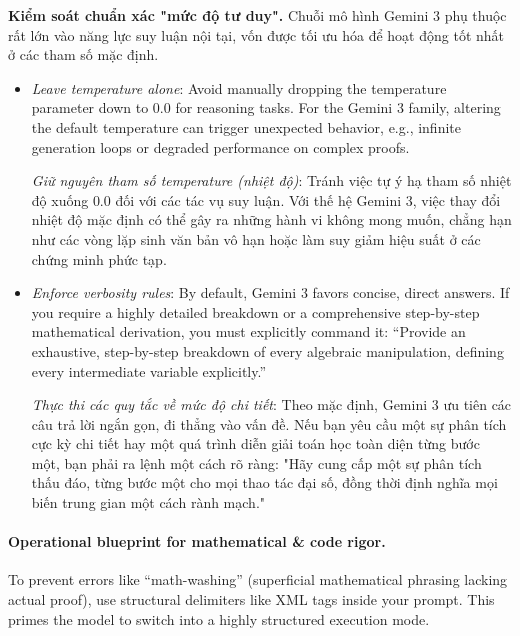 \documentclass{article}
\begin{document}
\begin{enumerate}
	\textbf{Kiểm soát chuẩn xác "mức độ tư duy".} Chuỗi mô hình Gemini 3 phụ thuộc rất lớn vào năng lực suy luận nội tại, vốn được tối ưu hóa để hoạt động tốt nhất ở các tham số mặc định.
	\begin{itemize}
		\item \textit{Leave temperature alone}: Avoid manually dropping the temperature parameter down to $0.0$ for reasoning tasks. For the Gemini 3 family, altering the default temperature can trigger unexpected behavior, e.g., infinite generation loops or degraded performance on complex proofs.
		
		\textit{Giữ nguyên tham số temperature (nhiệt độ)}: Tránh việc tự ý hạ tham số nhiệt độ xuống $0.0$ đối với các tác vụ suy luận. Với thế hệ Gemini 3, việc thay đổi nhiệt độ mặc định có thể gây ra những hành vi không mong muốn, chẳng hạn như các vòng lặp sinh văn bản vô hạn hoặc làm suy giảm hiệu suất ở các chứng minh phức tạp.
		\item \textit{Enforce verbosity rules}: By default, Gemini 3 favors concise, direct answers. If you require a highly detailed breakdown or a comprehensive step-by-step mathematical derivation, you must explicitly command it: ``Provide an exhaustive, step-by-step breakdown of every algebraic manipulation, defining every intermediate variable explicitly.''
		
		\textit{Thực thi các quy tắc về mức độ chi tiết}: Theo mặc định, Gemini 3 ưu tiên các câu trả lời ngắn gọn, đi thẳng vào vấn đề. Nếu bạn yêu cầu một sự phân tích cực kỳ chi tiết hay một quá trình diễn giải toán học toàn diện từng bước một, bạn phải ra lệnh một cách rõ ràng: "Hãy cung cấp một sự phân tích thấu đáo, từng bước một cho mọi thao tác đại số, đồng thời định nghĩa mọi biến trung gian một cách rành mạch."
	\end{itemize}
\end{enumerate}

\paragraph{Operational blueprint for mathematical \& code rigor.} To prevent errors like ``math-washing'' (superficial mathematical phrasing lacking actual proof), use structural delimiters like XML tags inside your prompt. This primes the model to switch into a highly structured execution mode.
\end{document}
